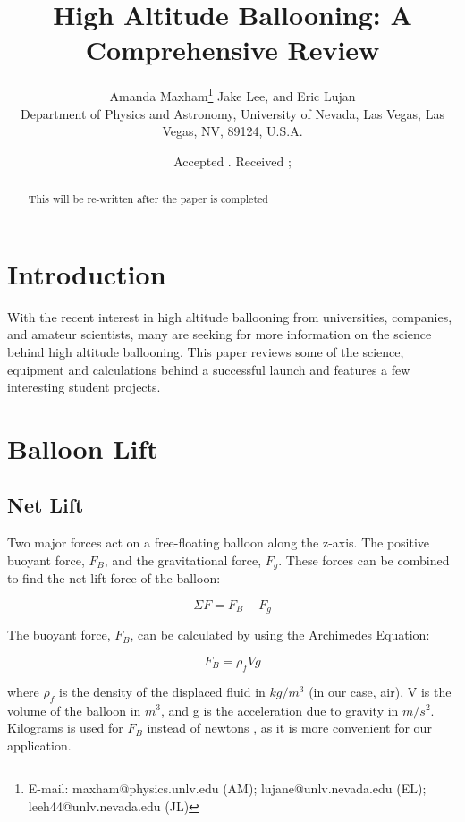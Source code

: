 \documentclass[usenatbib]{mn2e}
\title[]{High Altitude Ballooning: A Comprehensive Review}
\author[Amanda Maxham, etc.]{Amanda Maxham\thanks{E-mail:
maxham@physics.unlv.edu (AM); lujane@unlv.nevada.edu (EL); leeh44@unlv.nevada.edu (JL)} Jake Lee, and Eric Lujan\\
Department of Physics and Astronomy, University of Nevada, Las Vegas, Las Vegas, NV, 89124, U.S.A.}
\begin{document}
\date{Accepted . Received ; }

\pagerange{\pageref{firstpage}--\pageref{lastpage}} 

\maketitle

\label{firstpage}
\begin{abstract}
This will be re-written after the paper is completed
\end{abstract}
\section{Introduction}
With the recent interest in high altitude ballooning from universities, companies, and amateur scientists, many are seeking for more information on the science behind high altitude ballooning. This paper reviews some of the science, equipment and calculations behind  a successful launch and features a few interesting student projects.

\section{Balloon Lift}

\subsection{Net Lift}

Two major forces act on a free-floating balloon along the z-axis. The positive buoyant force, $F_B$, and the gravitational force, $F_g$. These forces can be combined to find the net lift force of the balloon:

\begin{equation} 
\Sigma F= F_B - F_g
\end{equation}

The buoyant force, $F_B$, can be calculated by using the Archimedes Equation:

\begin{equation} \label{eq:Buoyancy}
F_{B} = \rho_f V g
\end{equation}

where $\rho_f$ is the density of the displaced fluid in $kg/m^3$ (in our case, air), V is the volume of the balloon in $m^3$, and g is the acceleration due to gravity in $m/s^2$. Kilograms is used for $F_{B}$ instead of newtons , as it is more convenient for our application.
\end{document}
